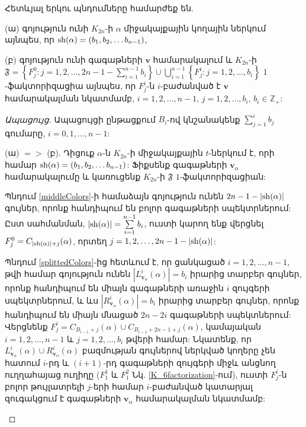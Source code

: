 \begin{hide}
\begin{lemma}\label{lEquiv}
Հետևյալ երկու պնդումները համարժեք են.
\begin{description}
\item{(ա)} գոյություն ունի $K_{2n}$-ի $\alpha$ միջակայքային կողային ներկում այնպես, որ ${\rm sh}(\alpha) = (b_1, b_2, \ldots b_{n-1})$,
\item{(բ)} գոյություն ունի գագաթների $\mathbf{v}$ համարակալում և $K_{2n}$-ի $\mathfrak{F} = 
\left\{ F^0_j : j=1,2,\ldots,2n-1-\sum\limits_{i=1}^{n-1}b_i \right\}
\cup
\bigcup\limits_{i=1}^{n-1}\left\{F^i_j : j=1,2,\ldots,b_i\right\}$ $1$-ֆակտորիզացիա այնպես, որ $F^i_j$-ն $i$-բաժանված է $\mathbf{v}$ համարակալման նկատմամբ, $i=1,2,\ldots,n-1$, $j=1,2,\ldots,b_i$, $b_i \in \mathbb{Z}_+$:
\end{description}
\end{lemma}

\begin{proof}[Ապացույց]
Ապացույցի ընթացքում $B_i$-ով կնշանակենք $\sum\limits_{j=1}^{i}b_j$ գումարը, $i=0,1,\ldots,n-1$:

\begin{description}
\item{(ա) $=>$ (բ)}. Դիցուք $\alpha$-ն $K_{2n}$-ի միջակայքային $t$-ներկում է, որի համար ${\rm sh}(\alpha) = (b_1, b_2, \ldots b_{n-1})$: Ֆիքսենք գագաթների $\mathbf{v}_\alpha$ համարակալումը և կառուցենք $K_{2n}$-ի $\mathfrak{F}$ $1$-ֆակտորիզացիան: 

Պնդում \ref{middleColors}-ի համաձայն գոյություն ունեն $2n-1-|{\rm sh}(\alpha)|$ գույներ, որոնք հանդիպում են բոլոր գագաթների սպեկտրներում: Ըստ սահմանման, $|{\rm sh}(\alpha)| = \sum\limits_{i=1}^{n-1}b_i$, ուստի կարող ենք վերցնել $F_j^0 = C_{|{\rm sh}(\alpha)|+j}(\alpha)$, որտեղ $j=1,2,\ldots,2n-1-|{\rm sh}(\alpha)|$:

Պնդում \ref{splittedColors}-ից հետևում է, որ ցանկացած $i=1,2,\ldots,n-1$, թվի համար գոյություն ունեն $|L_{\mathbf{v}_\alpha}^i(\alpha)|=b_i$ իրարից տարբեր գույներ, որոնք հանդիպում են միայն գագաթների առաջին $i$ զույգերի սպեկտրներում, և ևս $|R_{\mathbf{v}_\alpha}^i(\alpha)|=b_i$ իրարից տարբեր գույներ, որոնք հանդիպում են միայն մնացած $2n-2i$ գագաթների սպեկտներում: Վերցնենք $F^i_j = C_{B_{i-1} + j}(\alpha) \cup C_{B_{i-1} + 2n - 1 + j}(\alpha)$, կամայական $i=1,2,\ldots,n-1$ և $j=1,2,\ldots,b_i$ թվերի համար: Նկատենք, որ $L_{\mathbf{v}_\alpha}^i(\alpha) \cup R_{\mathbf{v}_\alpha}^i(\alpha)$ բազմության գույներով ներկված կողերը չեն հատում $i$-րդ և $(i+1)$-րդ գագաթների զույգերի միջև անցնող ուղղահայաց ուղիղը ($F_1^1$ և $F_1^2$ Նկ. \ref{K_6factorization}-ում), ուստի $F^i_j$-ն բոլոր թույլատրելի $j$-երի համար $i$-բաժանված կատարյալ զուգակցում է գագաթների $\mathbf{v}_\alpha$ համարակալման նկատմամբ:


\end{description}
\end{proof}
\end{hide}
